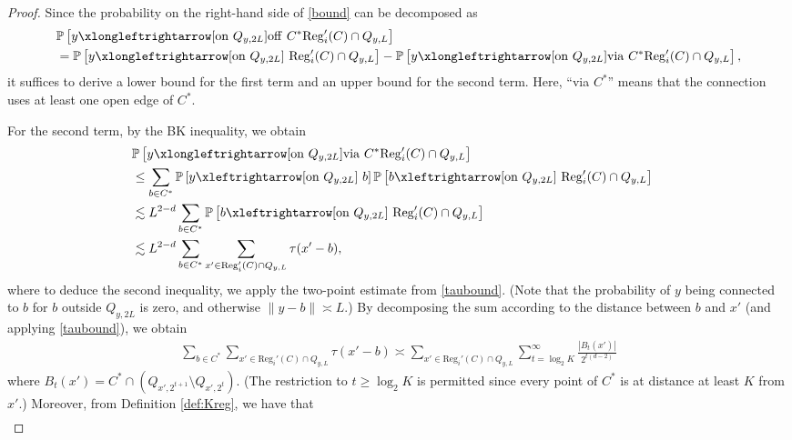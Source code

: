 \documentclass[11pt]{article}
\theoremstyle{definition}
\theoremstyle{remark}
\newcommand{\bP}{\mathbb{P}}
\numberwithin{equation}{section}
\theoremstyle{plain}
\theoremstyle{definition}
\theoremstyle{remark}
\theoremstyle{plain}
\begin{document}
\begin{proof}
    Since the probability on the right-hand side of \eqref{bound} can be decomposed as
    \begin{align}
      &\bP\left[y \xlongleftrightarrow[\mathrm{on}~Q_{y,2L}]{\mathrm{off}~C^*}\mathrm{Reg}_i'(C)\cap Q_{y,L}\right]\nonumber\\
      &= \bP\left[y \xlongleftrightarrow[\mathrm{on}~Q_{y,2L}]{~} \mathrm{Reg}_i'(C)\cap Q_{y,L}\right]- \bP\left[y \xlongleftrightarrow[\mathrm{on}~Q_{y,2L}]{\mathrm{via}~C^*}\mathrm{Reg}_i'(C)\cap Q_{y,L}\right], \label{offrestconnection}
    \end{align}
    it suffices to derive a lower bound for the first term and an upper bound for the second term. Here, ``via $C^*$'' means that the connection uses at least one open edge of $C^*$.

    For the second term, by the BK inequality, we obtain
    \begin{align*}
        \lefteqn{\bP\left[y \xlongleftrightarrow[\mathrm{on}~Q_{y,2L}]{\mathrm{via}~C^*}\mathrm{Reg}_i'(C)\cap Q_{y,L}\right]}\\
        &\le \sum_{b \in C^*}\bP\left[y \xleftrightarrow[\text{on}~Q_{y,2L}]{~}b\right]\bP\left[b \xleftrightarrow[\text{on}~Q_{y,2L}]{~}\mathrm{Reg}_i'(C)\cap Q_{y,L}\right]\\
         &\lesssim L^{2-d}\sum_{b \in C^*}\bP\left[b \xleftrightarrow[\text{on}~Q_{y,2L}]{~}\mathrm{Reg}_i'(C)\cap Q_{y,L}\right]\\
         &\lesssim  L^{2-d}\sum_{b \in C^*}\sum_{x' \in \mathrm{Reg}_i'(C)\cap Q_{y,L}}\tau(x'-b),
    \end{align*}
where to deduce the second inequality, we apply the two-point estimate from \eqref{taubound}. (Note that the probability of $y$ being connected to $b$
for $b$ outside $Q_{y,2L}$ is zero, and otherwise $\|y-b\|\asymp L$.) By decomposing the sum according to the distance between $b$ and $x'$ (and applying \eqref{taubound}), we obtain
    \begin{align*}
        \sum_{b \in C^*}\sum_{x' \in \mathrm{Reg}_i'(C)\cap Q_{y,L}}\tau(x'-b)\asymp \sum_{x' \in \mathrm{Reg}_i'(C)\cap Q_{y,L}}\sum_{t=\log_2K}^{\infty}
        \frac{|B_t(x')|}{2^{t(d-2)}}
    \end{align*}
    where $B_t(x')=C^*\cap (Q_{x',2^{t+1}}\setminus Q_{x',2^{t}})$. (The restriction to $t\ge \log_2K$ is permitted since every point of $C^*$ is at distance at least $K$ from $x'$.) Moreover, from Definition \ref{def:Kreg}, we have that
    \begin{align*}

\end{align*}
\end{proof}
\end{document}
